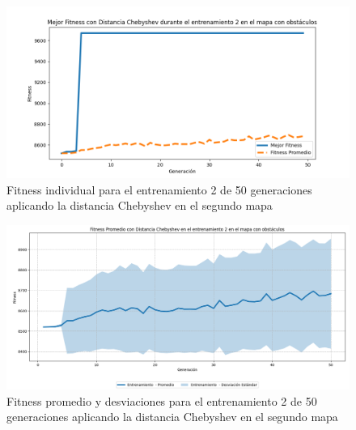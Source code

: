 \documentclass[conference]{IEEEtran}
\begin{document}
\begin{figure}[H]
    \centering
    \includegraphics[width=0.9 \linewidth]{Chebyshev/Mapa2/Fitness_2_Map2_Cheby_50Gen.png}
    \caption{Fitness individual para el entrenamiento 2 de 50 generaciones aplicando la distancia Chebyshev en el segundo mapa}
    \label{fig:cheb_2_50_m2}
\end{figure}
\begin{figure}[H]
    \centering
    \includegraphics[width=0.9 \linewidth]{Chebyshev/Mapa2/Fitness_2_Map2_Cheby_50Gen_Sombra.png}
    \caption{Fitness promedio y desviaciones para el entrenamiento 2 de 50 generaciones aplicando la distancia Chebyshev en el segundo mapa}
    \label{fig:cheb_2_50_sombra_m2}
\end{figure}
\end{document}
